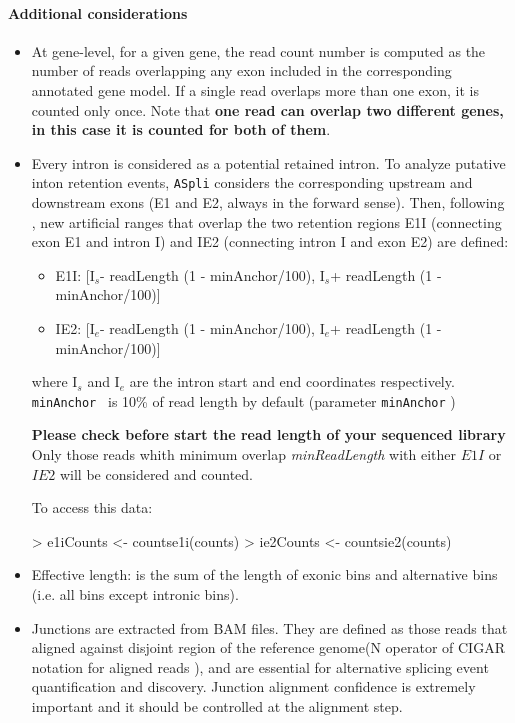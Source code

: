 \documentclass{article}
\begin{document}
\paragraph{Additional considerations}
\label{sec:intronFlanking}
\begin{itemize}
\item At gene-level, for a given gene, the read count number is computed as
the number of reads overlapping any exon included in the corresponding annotated gene model. If a single read overlaps more than one exon, it is counted only once. Note that \textbf{one read can
overlap two different genes, in this case it is counted for both of them}.

\item Every intron is considered as a potential retained intron.  To analyze putative inton retention events, \texttt{ASpli} considers the  corresponding upstream and downstream exons (E1 and E2, always in the forward sense). Then, following \cite{pmid25258385}, new artificial ranges that overlap the two retention regions E1I 
(connecting exon E1 and intron I) and IE2 (connecting intron I and exon E2) are defined:

\begin{itemize}
  \item E1I: [I$_{s}$- readLength (1 - minAnchor/100), I$_{s}$+ readLength (1 - minAnchor/100)]
  \item IE2: [I$_{e}$- readLength (1 - minAnchor/100), I$_{e}$+ readLength (1 - minAnchor/100)]
\end{itemize}

where I$_{s}$ and I$_{e}$ are the intron start and end coordinates respectively. \texttt{ minAnchor } is 10\% of read length by default (parameter \texttt{minAnchor} )


\textbf{Please check before start the read length of your sequenced library} Only those reads whith minimum overlap \textit{minReadLength} with either $E1I$ or $IE2$ will be considered and counted. 

To access this data:

\begin{Schunk}
\begin{Sinput}
> e1iCounts <- countse1i(counts)
> ie2Counts <- countsie2(counts)
\end{Sinput}
\end{Schunk}

\item Effective length: is the sum of the length of exonic bins and alternative bins (i.e. all bins except intronic bins).

\item Junctions are extracted from BAM files. They are defined as those reads
that aligned against disjoint region of the reference genome(N operator of CIGAR notation
for aligned reads \cite{pmid19505943} ), and are essential for alternative splicing event quantification and discovery. Junction alignment confidence is extremely important and it should be controlled at the alignment step.
\end{itemize}
\end{document}

